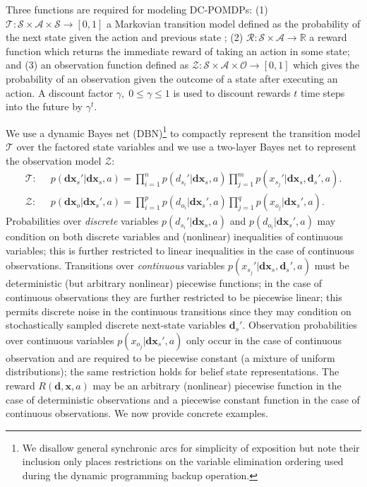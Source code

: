 \documentclass{article} %
\renewcommand{\vec}[1]{\mathbf{#1}} %
\newcommand{\xds}{\mathbf{dx}_s}
\newcommand{\xdsp}{\mathbf{dx}_s'}
\newcommand{\xdo}{\mathbf{dx}_o}
\begin{document}
Three functions are required for modeling DC-POMDPs: (1) $\mathcal{T}: \mathcal{S} \times \mathcal{A} \times \mathcal{S} \rightarrow  [ 0, 1 ]$ a Markovian transition model defined as the probability of the next state %
given the action and previous state%
; (2)  $\mathcal{R}:\mathcal{S}\times\mathcal{A} \rightarrow \mathbb{R}$ a reward function which returns the immediate reward of taking an action in some state; and (3) an observation function defined as $\mathcal{Z} : \mathcal{S} \times \mathcal{A} \times \mathcal{O} \rightarrow [ 0, 1 ]$  which gives the probability of an observation given the outcome of a state after executing an action.  A discount factor $\gamma, \; 0 \leq \gamma \leq 1$ is used to discount rewards $t$ time steps into the future by $\gamma^t$.

We use a dynamic Bayes net (DBN)\footnote{We disallow general 
  synchronic arcs for simplicity of exposition but
  note their inclusion only places restrictions on the variable
  elimination ordering used during the dynamic programming backup
  operation.} to compactly represent the transition model $\mathcal{T}$ over the
factored state variables and we use a two-layer Bayes net to
represent the observation model $\mathcal{Z}$: {\footnotesize
\begin{align}
\mathcal{T}: \;\; &
p(\xdsp|\xds,a) = 
\prod_{i=1}^n p(d_{s_i}'|\xds,a) \prod_{j=1}^m p(x_{s_j}'|\xds, \vec{d}_s',a). \label{eq:trans_model} \\
\mathcal{Z}: \;\; & 
p(\xdo|\xdsp,a) = 
\prod_{i=1}^p p(d_{o_i}|\xdsp,a) \prod_{j=1}^q p(x_{o_j}|\xdsp,a). \label{eq:obs_model}
\end{align}}
Probabilities over \emph{discrete} variables $p(d_{s_i}'|\xds,a)$ and
$p(d_{o_i}|\xdsp,a)$ may condition on both discrete variables and
(nonlinear) inequalities of continuous variables; this is further
restricted to linear inequalities in the case of continuous
observations.  Transitions over \emph{continuous}
variables $p(x_{s_j}'|\xds, \vec{d}_s',a)$ must be deterministic (but
arbitrary nonlinear) piecewise functions;
in the case of continuous observations they are further restricted to
be piecewise linear; this permits discrete noise in the continuous 
transitions since they may condition on stochastically sampled
discrete next-state variables $\vec{d}_s'$.
Observation probabilities over continuous variables $p(x_{o_j}|\xdsp,a)$ 
only occur in the case of continuous observation and are required to be
piecewise constant (a mixture of uniform distributions); the same
restriction holds for belief state representations.
The reward $R(\vec{d},\vec{x},a)$ may be 
an arbitrary (nonlinear) piecewise function in the case of
deterministic observations and a piecewise constant function in the
case of continuous observations.  
We now provide concrete examples.
\end{document}
